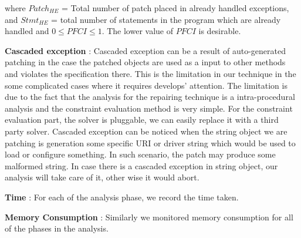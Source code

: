 \begin{mylist}
where $Patch_{HE}$ = Total number of patch placed in already handled exceptions,
and $Stmt_{HE}$ =  total number of statements in the program which are already
handled and $0 \le PFCI \le 1$. The lower value of $PFCI$ is desirable.


\item \textbf{Cascaded exception} : Cascaded exception can be a result of 
auto-generated patching in the case the patched objects are used as a input
to other methods and violates the specification there. This is the limitation
in our technique in the some complicated cases where it requires develops' 
attention. The limitation is due to the fact that the analysis for the repairing 
technique is a intra-procedural analysis and the constraint evaluation method is
very simple. For the constraint evaluation part, the solver is pluggable, we can
easily replace it with a third party solver. Cascaded exception can be noticed 
when the string object we are patching is generation some specific URI or driver
string which would be used to load or configure something. In such scenario, the
patch may produce some malformed string. In case there is a cascaded exception 
in string object, our analysis will take care of it, other wise it would abort. 

\item \textbf{Time} : For each of the analysis phase, we record the time taken.

\item \textbf{Memory Consumption} : Similarly we monitored memory consumption
for all of the phases in the analysis.

\end{mylist}


